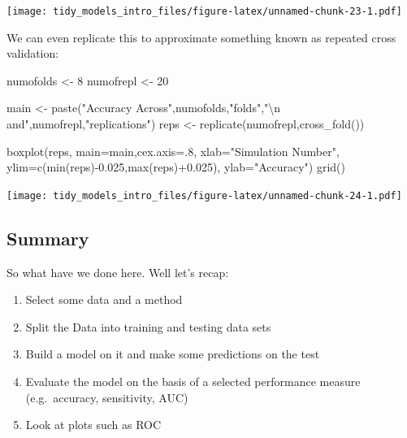 \documentclass[
]{article}
\newenvironment{Shaded}{\begin{snugshade}}{\end{snugshade}}
\newcommand{\AttributeTok}[1]{\textcolor[rgb]{0.77,0.63,0.00}{#1}}
\newcommand{\DecValTok}[1]{\textcolor[rgb]{0.00,0.00,0.81}{#1}}
\newcommand{\FloatTok}[1]{\textcolor[rgb]{0.00,0.00,0.81}{#1}}
\newcommand{\FunctionTok}[1]{\textcolor[rgb]{0.00,0.00,0.00}{#1}}
\newcommand{\NormalTok}[1]{#1}
\newcommand{\OtherTok}[1]{\textcolor[rgb]{0.56,0.35,0.01}{#1}}
\newcommand{\SpecialCharTok}[1]{\textcolor[rgb]{0.00,0.00,0.00}{#1}}
\newcommand{\StringTok}[1]{\textcolor[rgb]{0.31,0.60,0.02}{#1}}
\providecommand{\tightlist}{%
  \setlength{\itemsep}{0pt}\setlength{\parskip}{0pt}}
\begin{document}
\texttt{[image: tidy\_models\_intro\_files/figure-latex/unnamed-chunk-23-1.pdf]}

We can even replicate this to approximate something known as repeated
cross validation:

\begin{Shaded}
\begin{Highlighting}[]
\NormalTok{numofolds }\OtherTok{\textless{}{-}} \DecValTok{8}
\NormalTok{numofrepl }\OtherTok{\textless{}{-}} \DecValTok{20}

\NormalTok{main }\OtherTok{\textless{}{-}} \FunctionTok{paste}\NormalTok{(}\StringTok{"Accuracy Across"}\NormalTok{,numofolds,}\StringTok{"folds"}\NormalTok{,}\StringTok{"}\SpecialCharTok{\textbackslash{}n}\StringTok{ and"}\NormalTok{,numofrepl,}\StringTok{"replications"}\NormalTok{)}
\NormalTok{reps }\OtherTok{\textless{}{-}} \FunctionTok{replicate}\NormalTok{(numofrepl,}\FunctionTok{cross\_fold}\NormalTok{())}

\FunctionTok{boxplot}\NormalTok{(reps,}
        \AttributeTok{main=}\NormalTok{main,}\AttributeTok{cex.axis=}\NormalTok{.}\DecValTok{8}\NormalTok{,}
        \AttributeTok{xlab=}\StringTok{"Simulation Number"}\NormalTok{,}
        \AttributeTok{ylim=}\FunctionTok{c}\NormalTok{(}\FunctionTok{min}\NormalTok{(reps)}\SpecialCharTok{{-}}\FloatTok{0.025}\NormalTok{,}\FunctionTok{max}\NormalTok{(reps)}\SpecialCharTok{+}\FloatTok{0.025}\NormalTok{),}
        \AttributeTok{ylab=}\StringTok{"Accuracy"}\NormalTok{)}
\FunctionTok{grid}\NormalTok{()}
\end{Highlighting}
\end{Shaded}

\texttt{[image: tidy\_models\_intro\_files/figure-latex/unnamed-chunk-24-1.pdf]}

\hypertarget{summary}{%
\subsection{Summary}\label{summary}}

So what have we done here. Well let's recap:

\begin{enumerate}
\def\labelenumi{\arabic{enumi})}
\tightlist
\item
  Select some data and a method
\item
  Split the Data into training and testing data sets
\item
  Build a model on it and make some predictions on the test
\item
  Evaluate the model on the basis of a selected performance measure
  (e.g.~accuracy, sensitivity, AUC)
\item
  Look at plots such as ROC
\end{enumerate}
\end{document}
